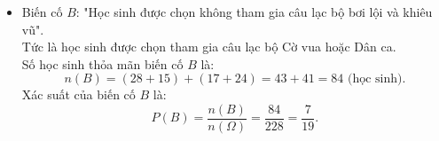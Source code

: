\begin{bt}
{\begin{enumerate}[a)]
\begin{itemize}
			Tổng số học sinh nữ là:
			$$n(A) = 15 + 24 + 35 + 40 = 114\text{ (học sinh)}.$$
			Xác suất của biến cố $A$ là:
			$$P(A) = \frac{n(A)}{n(\Omega)} = \frac{114}{228} = \frac{1}{2} = 0{,}5.$$
			\item Biến cố $B$: "Học sinh được chọn không tham gia câu lạc bộ bơi lội và khiêu vũ".\\
			Tức là học sinh được chọn tham gia câu lạc bộ Cờ vua hoặc Dân ca.\\
			Số học sinh thỏa mãn biến cố $B$ là:
			$$n(B) = (28 + 15) + (17 + 24) = 43 + 41 = 84\text{ (học sinh)}.$$
			Xác suất của biến cố $B$ là:
			$$P(B) = \frac{n(B)}{n(\Omega)} = \frac{84}{228} = \frac{7}{19}.$$
		\end{itemize}
	\end{enumerate}
}
\end{bt}

